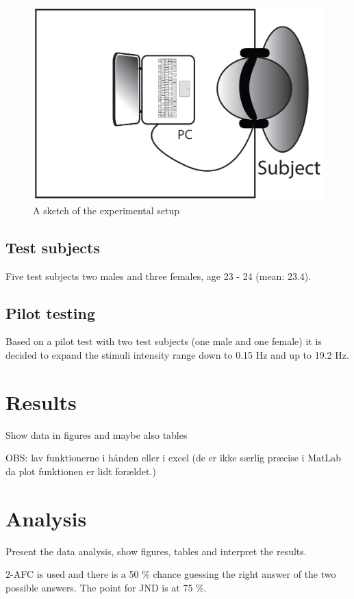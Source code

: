 \begin{figure}[H]
\centering
\includegraphics[width = \textwidth]{Figure/Vores_Figurer/experiment.png} 
\caption{A sketch of the experimental setup}
\label{fig:experiment}
\end{figure}

\subsection*{Test subjects}
%
Five test subjects two males and three females, age 23 - 24 (mean: 23.4).

\subsection*{Pilot testing}
%
Based on a pilot test with two test subjects (one male and one female) it is decided to expand the stimuli intensity range down to 0.15 Hz and up to 19.2 Hz.

\section*{Results}
Show data in figures and maybe also tables

OBS: lav funktionerne i hånden eller i excel (de er ikke særlig præcise i MatLab da plot funktionen er lidt forældet.)

\section*{Analysis}
Present the data analysis, show figures, tables and interpret the results.

2-AFC is used and there is a 50 \% chance guessing the right answer of the two possible answers. The point for JND is at 75 \%.

